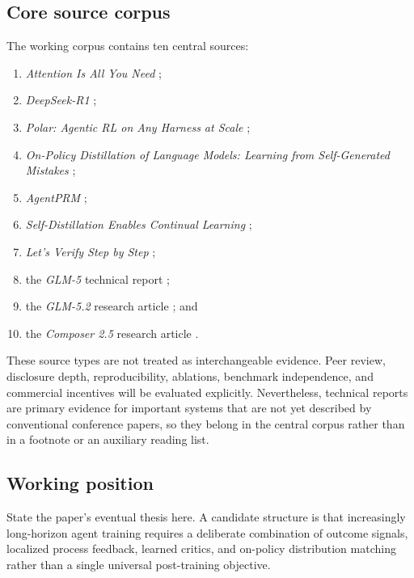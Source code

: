 \subsection{Core source corpus}
The working corpus contains ten central sources:
\begin{enumerate}
  \item \emph{Attention Is All You Need} \citep{vaswani2017attention};
  \item \emph{DeepSeek-R1} \citep{guo2025deepseekr1};
  \item \emph{Polar: Agentic RL on Any Harness at Scale} \citep{xu2026polar};
  \item \emph{On-Policy Distillation of Language Models: Learning from
        Self-Generated Mistakes} \citep{agarwal2024onpolicy};
  \item \emph{AgentPRM} \citep{xi2025agentprm};
  \item \emph{Self-Distillation Enables Continual Learning}
        \citep{shenfeld2026selfdistillation};
  \item \emph{Let's Verify Step by Step} \citep{lightman2023verify};
  \item the \emph{GLM-5} technical report \citep{glm5team2026};
  \item the \emph{GLM-5.2} research article \citep{glm52team2026}; and
  \item the \emph{Composer 2.5} research article \citep{cursor2026composer25}.
\end{enumerate}
These source types are not treated as interchangeable evidence. Peer review, disclosure
depth, reproducibility, ablations, benchmark independence, and commercial incentives
will be evaluated explicitly. Nevertheless, technical reports are primary evidence for
important systems that are not yet described by conventional conference papers, so they
belong in the central corpus rather than in a footnote or an auxiliary reading list.

\subsection{Working position}
State the paper's eventual thesis here. A candidate structure is that increasingly
long-horizon agent training requires a deliberate combination of outcome signals,
localized process feedback, learned critics, and on-policy distribution matching rather
than a single universal post-training objective.
